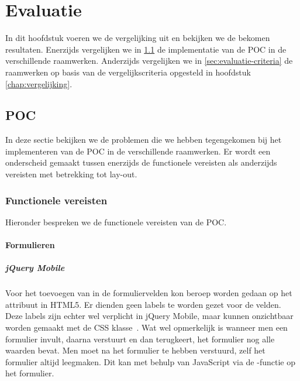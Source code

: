\chapter{Evaluatie}
\label{chap:evaluatie}

In dit hoofdstuk voeren we de vergelijking uit en bekijken we de bekomen resultaten.
Enerzijds vergelijken we in \ref{sec:evaluatie-poc} de implementatie van de POC in de verschillende raamwerken.
Anderzijds vergelijken we in \ref{sec:evaluatie-criteria} de raamwerken op basis van de vergelijkscriteria opgesteld in hoofdstuk \ref{chap:vergelijking}.


\section{POC}
\label{sec:evaluatie-poc}
In deze sectie bekijken we de problemen die we hebben tegengekomen bij het implementeren van de POC in de verschillende raamwerken.
Er wordt een onderscheid gemaakt tussen enerzijds de functionele vereisten als anderzijds vereisten met betrekking tot lay-out.

\subsection{Functionele vereisten}
Hieronder bespreken we de functionele vereisten van de POC.

\subsubsection{Formulieren}

\paragraph{jQuery Mobile} 
Voor het toevoegen van  in de formuliervelden kon beroep worden gedaan op het  attribuut in HTML5. Er dienden geen labels te worden gezet voor de velden. Deze labels zijn echter wel verplicht in jQuery Mobile, maar kunnen onzichtbaar worden gemaakt met de  CSS klasse~\cite{JQuery2013}. Wat wel opmerkelijk is wanneer men een formulier invult, daarna verstuurt en dan terugkeert, het formulier nog alle waarden bevat. Men moet na het formulier te hebben verstuurd, zelf het formulier altijd leegmaken. Dit kan met behulp van JavaScript via de -functie op het formulier.

